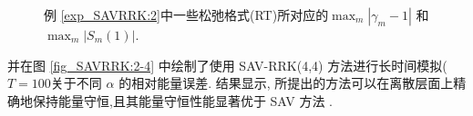 \begin{figure}[H]
\begin{center}
\caption{例 \ref{exp_SAVRRK:2}中一些松弛格式(RT)所对应的$\max_m\left|\gamma_m-1\right|$ 和 $\max_m\left|S_m(1)\right|$.}
\label{fig_SAVRRK:2-1}
\end{center}
\end{figure}
并在图 \ref{fig_SAVRRK:2-4} 中绘制了使用 SAV-RRK(4,4) 方法进行长时间模拟($T=100$关于不同 $\alpha$ 的相对能量误差.
结果显示, 所提出的方法可以在离散层面上精确地保持能量守恒,且其能量守恒性能显著优于 SAV 方法 \cite{chengConvergenceEnergyconservingScheme2022}.
